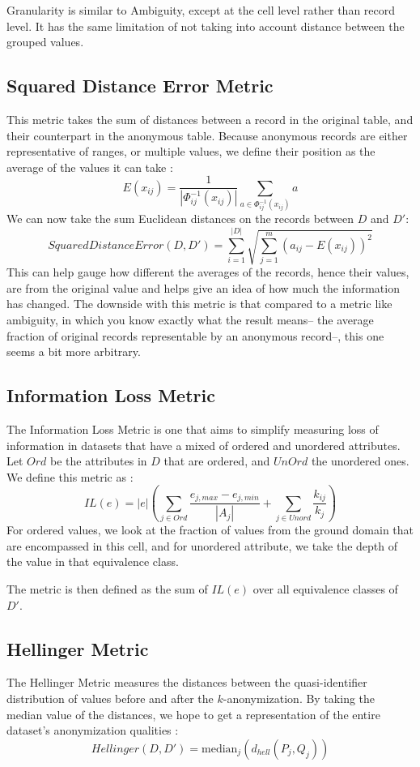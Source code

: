 Granularity is similar to Ambiguity, except at the cell level rather than record level. It has the same limitation of not taking into account distance between the grouped values. 

\subsection{Squared Distance Error Metric}
This metric takes the sum of distances between a record in the original table, and their counterpart in the anonymous table. Because anonymous records are either representative of ranges, or multiple values, we define their position as the average of the values it can take \cite{dse_metric}: 
$$
    E(x_{ij})= \frac{1}{|\Phi_{ij}^{-1}(x_{ij})|} \sum_{a \in \Phi_{ij}^{-1}(x_{ij})} a
$$
We can now take the sum Euclidean distances on the records between $D$ and $D'$:
$$
    Squared Distance Error(D, D')= \sum_{i=1}^{|D|} \sqrt{\sum_{j=1}^{m} (a_{ij}- E(x_{ij}))^2}
$$
This can help gauge how different the averages of the records, hence their values, are from the original value and helps give an idea of how much the information has changed. The downside with this metric is that compared to a metric like ambiguity, in which you know exactly what the result means-- the average fraction of original records representable by an anonymous record--, this one seems a bit more arbitrary.

\subsection{Information Loss Metric}
The Information Loss Metric is one that aims to simplify measuring loss of information in datasets that have a mixed of ordered and unordered attributes. Let $Ord$ be the attributes in $D$ that are ordered, and $UnOrd$ the unordered ones. We define this metric as \cite{ilm}: 
$$
    IL(e) = |e|\left(\sum_{j \in Ord}\frac{e_{j,max} - e_{j,min}}{|A_j|}
    + \sum_{j \in Unord}\frac{k_{ij}}{k_j}\right)
$$
For ordered values, we look at the fraction of values from the ground domain that are encompassed in this cell, and for unordered attribute, we take the depth of the value in that equivalence class.

The metric is then defined as the sum of $IL(e)$ over all equivalence classes of $D'$.

\subsection{Hellinger Metric}
The Hellinger Metric measures the distances between the quasi-identifier distribution of values before and after the $k$-anonymization. By taking the median value of the distances, we hope to get a representation of the entire dataset's anonymization qualities \cite{hellinger&biv}:
$$
    Hellinger(D,D') = \text{median}_j\left( d_{hell}(P_j,Q_j)\right)
$$

